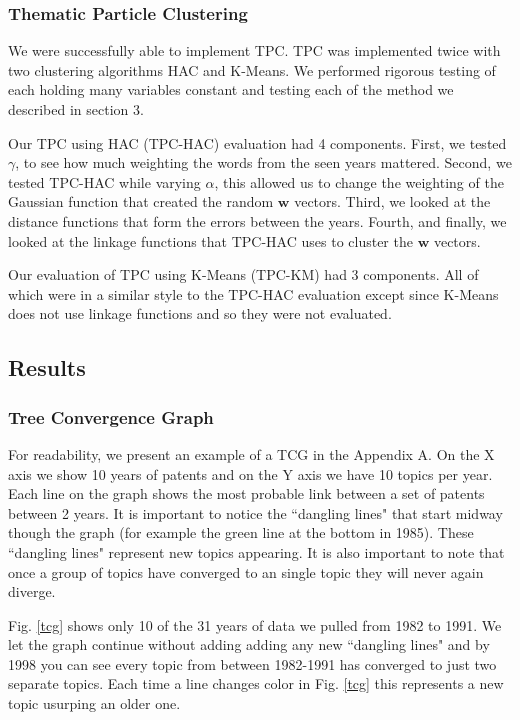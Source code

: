 \documentclass[conference]{IEEEtran}
\begin{document}
\subsubsection{Thematic Particle Clustering}
We were successfully able to implement TPC. TPC was implemented twice with two clustering algorithms HAC and K-Means. We performed rigorous testing of each holding many variables constant and testing each of the method we described in section 3.

Our TPC using HAC (TPC-HAC) evaluation had 4 components. First, we tested $\gamma$, to see how much weighting the words from the seen years mattered. Second, we tested TPC-HAC while varying $\alpha$, this allowed us to change the weighting of the Gaussian function that created the random $\mathbf{w}$ vectors. Third, we looked at the distance functions that form the errors between the years. Fourth, and finally, we looked at the linkage functions that TPC-HAC uses to cluster the $\mathbf{w}$ vectors.

Our evaluation of TPC using K-Means (TPC-KM)  had 3 components. All of which were in a similar style to the TPC-HAC evaluation except since K-Means does not use linkage functions and so they were not evaluated.

\subsection{Results}

\subsubsection{Tree Convergence Graph}
For readability, we  present an example of a TCG in the Appendix A. On the X axis we show 10 years of patents and on the Y axis we have 10 topics per year. Each line on the graph shows the most probable link between a set of patents between 2 years. It is important to notice the ``dangling lines" that start midway though the graph (for example the green line at the bottom in 1985). These ``dangling lines" represent new topics appearing. It is also important to note that once a group of topics have converged to an single topic they will never again diverge. 

Fig. \ref{tcg} shows only 10 of the 31 years of data we pulled from 1982 to 1991. We let the graph continue without adding adding any new ``dangling lines" and  by 1998 you can see every topic from between 1982-1991 has converged to just two separate topics. Each time a line changes color in Fig. \ref{tcg} this represents a new topic usurping an older one.
\end{document}
